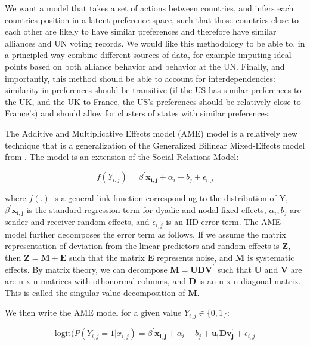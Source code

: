 We want a model that takes a set of actions between countries, and infers each countries position in a latent preference space, such that those countries close to each other are likely to have similar preferences and therefore have similar alliances and UN voting records. We would like this methodology to be able to, in a principled way combine different sources of data, for example imputing ideal points based on both alliance behavior and behavior at the UN. Finally, and importantly, this method should be able to account for interdependencies: similarity in preferences should be transitive (if the US has similar preferences to the UK, and the UK to France, the US's preferences should be relatively close to France's) and should allow for clusters of states with similar preferences.

The Additive and Multiplicative Effects model (AME) model is a relatively new technique that is a generalization of the Generalized Bilinear Mixed-Effects model from \citet{hoff:2005}. The model is an extension of the Social Relations Model: 

\begin{equation}
	f(Y_{i,j}) =  \beta^{'}\mathbf{x_{i,j}} + \alpha_{i} + b_{j} + \epsilon_{i,j}
\end{equation}

where $f(.)$ is a general link function corresponding to the distribution of Y, $\beta^{'}\mathbf{x_{i,j}}$ is the standard regression term for dyadic and nodal fixed effects,  $\alpha_{i}, b_{j}$ are sender and receiver random effects, and $\epsilon_{i,j}$ is an IID error term. The AME model further decomposes the  error term as follows. If we assume the matrix representation of deviation from the linear predictors and random effects is $\mathbf{Z}$, then $\mathbf{Z} = \mathbf{M} + \mathbf{E}$ such that the matrix $\mathbf{E}$ represents noise, and $\mathbf{M}$ is systematic effects. By matrix theory, we can decompose $\mathbf{M} = \mathbf{UDV^{'}}$ such that $\mathbf{U}$ and $\mathbf{V}$ are are n x n matrices with othonormal columns, and $\mathbf{D}$ is an n x n diagonal matrix. This is called the singular value decomposition of $\mathbf{M}$. 

We then write the AME model for a given value $Y_{i,j} \in \{0,1\}$:

\begin{equation}
	\text{logit}(P(Y_{i,j} = 1| x_{i,j}) = \beta^{'}\mathbf{x_{i,j}} + \alpha_{i} + b_{j} + \mathbf{u_{i}Dv^{'}_{j}} + \epsilon_{i,j}
\end{equation}

